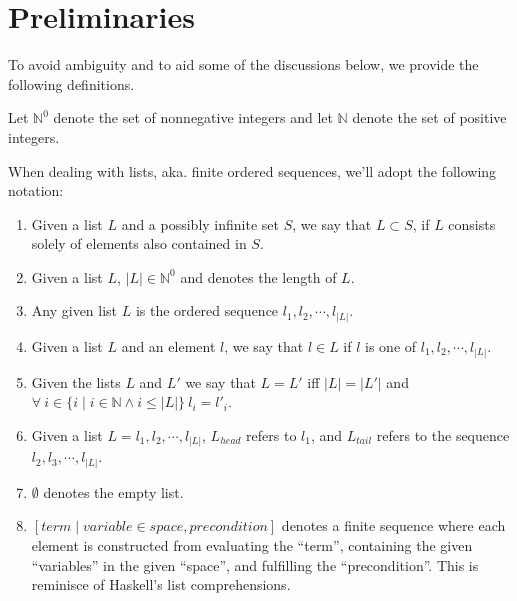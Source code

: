 \section{Preliminaries}

To avoid ambiguity and to aid some of the discussions below, we provide the
following definitions.

\begin{definition} Let $\mathbb{N}^0$ denote the set of nonnegative integers
and let $\mathbb{N}$ denote the set of positive integers.\end{definition}

\begin{definition} When dealing with lists, aka. finite ordered sequences,
we'll adopt the following notation:

\begin{enumerate}

\item Given a list $L$ and a possibly infinite set $S$, we say that $L\subset
S$, if $L$ consists solely of elements also contained in $S$.

\item Given a list $L$, $|L|\in\mathbb{N}^0$ and denotes the length of $L$.

\item Any given list $L$ is the ordered sequence $l_1,l_2,\cdots,l_{|L|}$.

\item Given a list $L$ and an element $l$, we say that $l\in L$ if $l$ is one
of $l_1,l_2,\cdots,l_{|L|}$.

\item Given the lists $L$ and $L'$ we say that $L=L'$ iff $|L|=|L'|$ and
$\forall\ i\in \{i\mid i\in\mathbb{N} \wedge i \leq |L|\}\ l_i=l'_i$.

\item Given a list $L=l_1,l_2,\cdots,l_{|L|}$, $L_{head}$ refers to $l_1$, and
$L_{tail}$ refers to the sequence $l_2,l_3,\cdots,l_{|L|}$.

\item $\emptyset$ denotes the empty list.

\item $\left[ term \mid variable \in space, precondition \right]$ denotes a
finite sequence where each element is constructed from evaluating the ``term'',
containing the given ``variables'' in the given ``space'', and fulfilling the
``precondition''. This is reminisce of Haskell's list comprehensions.

\end{enumerate}

\end{definition}

